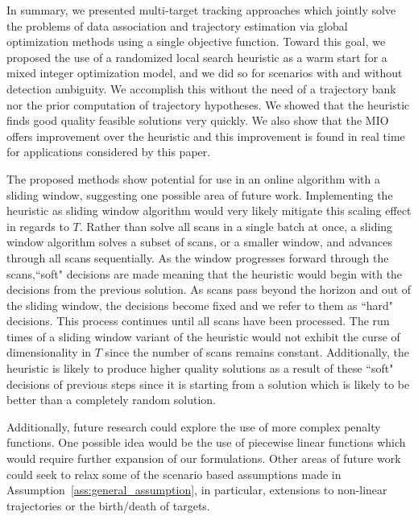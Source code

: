 In summary, we presented multi-target tracking approaches which jointly solve the problems of data association and trajectory estimation via global optimization methods using a single objective function. Toward this goal, we proposed the use of a randomized local search heuristic as a warm start for a mixed integer optimization model, and we did so for scenarios with and without detection ambiguity. We accomplish this without the need of a trajectory bank nor the prior computation of trajectory hypotheses. We showed that the heuristic finds good quality feasible solutions very quickly. We also show that the MIO offers improvement over the heuristic and this improvement is found in real time for applications considered by this paper.  

The proposed methods show potential for use in an online algorithm with a sliding window, suggesting one possible area of future work. Implementing the heuristic as sliding window algorithm would very likely mitigate this scaling effect in regards to $T$. Rather than solve all scans in a single batch at once, a sliding window algorithm solves a subset of scans, or a smaller window, and advances through all scans sequentially.  As the window progresses forward through the scans,``soft" decisions are made meaning that the heuristic would begin with the decisions from the previous solution. As scans pass beyond the horizon and out of the sliding window, the decisions become fixed and we refer to them as ``hard" decisions. This process continues until all scans have been processed. The run times of a sliding window variant of the heuristic would not exhibit the curse of dimensionality in $T$ since the number of scans remains constant. Additionally, the heuristic is likely to produce higher quality solutions as a result of these ``soft" decisions of previous steps since it is starting from a solution which is likely to be better than a completely random solution. 

Additionally, future research could explore the use of more complex penalty functions. One possible idea would be the use of piecewise linear functions which would require further expansion of our formulations. Other areas of future work could seek to relax some of the scenario based assumptions made in Assumption~\ref{ass:general_assumption}, in particular, extensions to non-linear trajectories or the birth/death of targets. 